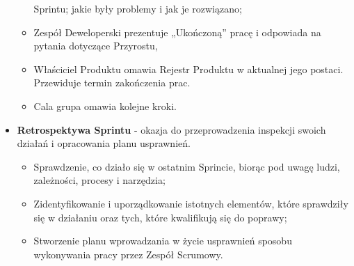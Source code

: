 \documentclass[a4paper]{article}
\begin{document}
\begin{itemize}
\begin{itemize}
            Sprintu; jakie były problemy i jak je rozwiązano;
            \item Zespół Deweloperski prezentuje „Ukończoną” pracę i
            odpowiada na pytania dotyczące Przyrostu,
            \item Właściciel Produktu omawia Rejestr Produktu w aktualnej
            jego postaci. Przewiduje termin zakończenia prac.
            \item Cala grupa omawia kolejne kroki.
        \end{itemize}
        \item \textbf{Retrospektywa Sprintu} - okazja do przeprowadzenia inspekcji
        swoich działań i opracowania planu usprawnień.
        \begin{itemize}
            \item Sprawdzenie, co działo się w ostatnim Sprincie, biorąc pod
            uwagę ludzi, zależności, procesy i narzędzia;
            \item Zidentyfikowanie i uporządkowanie istotnych elementów, które
            sprawdziły się w działaniu oraz tych, które kwalifikują się do
            poprawy;
            \item Stworzenie planu wprowadzania w życie usprawnień sposobu
            wykonywania pracy przez Zespół Scrumowy.
        \end{itemize}
    \end{itemize}
\end{document}
